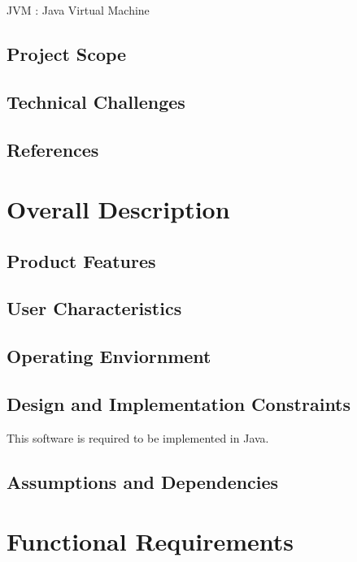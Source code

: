 \documentclass[12pt]{article}
\begin{document}
JVM : Java Virtual Machine 

\subsection{Project Scope}

\subsection{Technical Challenges}\label{technical-challenges}

\subsection{References}\label{references}

\section{Overall Description}\label{overall-description}

\subsection{Product Features}\label{product-features}


\subsection{User Characteristics}

\subsection{Operating Enviornment}\label{operating-enviornment}

\subsection{Design and Implementation
Constraints}\label{design-and-implementation-constraints}

This software is required to be implemented in Java. 
\subsection{Assumptions and Dependencies}

\section{Functional Requirements}\label{functional-requirements}
\end{document}
